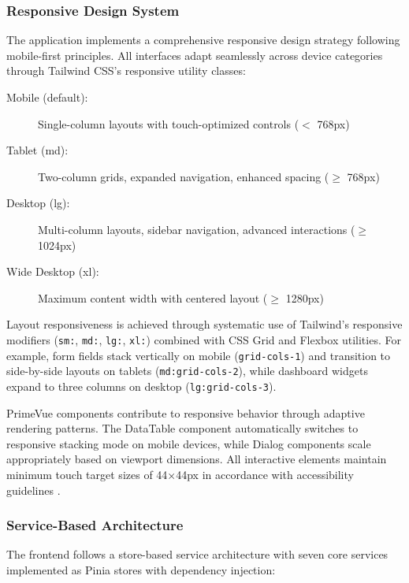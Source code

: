\subsubsection{Responsive Design System}

The application implements a comprehensive responsive design strategy following mobile-first principles. All interfaces adapt seamlessly across device categories through Tailwind CSS's responsive utility classes:

\begin{description}
    \item[Mobile (default):] Single-column layouts with touch-optimized controls ($<$ 768px)
    \item[Tablet (md):] Two-column grids, expanded navigation, enhanced spacing ($\geq$ 768px)
    \item[Desktop (lg):] Multi-column layouts, sidebar navigation, advanced interactions ($\geq$ 1024px)
    \item[Wide Desktop (xl):] Maximum content width with centered layout ($\geq$ 1280px)
\end{description}

Layout responsiveness is achieved through systematic use of Tailwind's responsive modifiers (\texttt{sm:}, \texttt{md:}, \texttt{lg:}, \texttt{xl:}) combined with CSS Grid and Flexbox utilities. For example, form fields stack vertically on mobile (\texttt{grid-cols-1}) and transition to side-by-side layouts on tablets (\texttt{md:grid-cols-2}), while dashboard widgets expand to three columns on desktop (\texttt{lg:grid-cols-3}).

PrimeVue components contribute to responsive behavior through adaptive rendering patterns. The DataTable component automatically switches to responsive stacking mode on mobile devices, while Dialog components scale appropriately based on viewport dimensions. All interactive elements maintain minimum touch target sizes of 44×44px in accordance with accessibility guidelines \cite{wcag2021}.

\subsubsection{Service-Based Architecture}

The frontend follows a store-based service architecture with seven core services implemented as Pinia stores with dependency injection:

